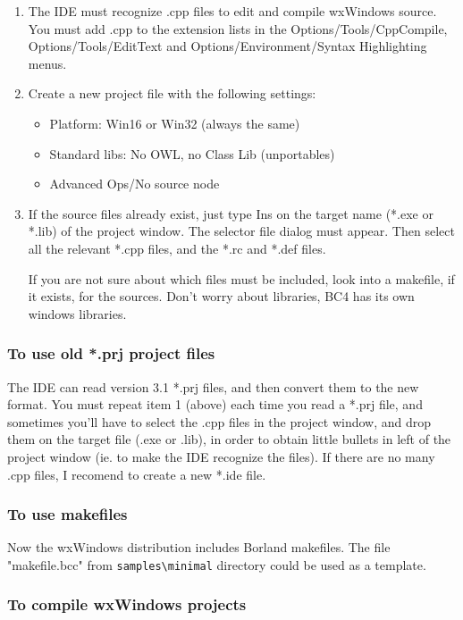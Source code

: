\begin{enumerate}
\item The IDE must recognize .cpp files to edit and compile wxWindows
source. You must add .cpp to the extension lists in the
Options/Tools/CppCompile, Options/Tools/EditText and
Options/Environment/Syntax Highlighting menus.
\item Create a new project file with the following settings:
\begin{itemize}
\item Platform: Win16 or Win32 (always the same)
\item Standard libs: No OWL, no Class Lib (unportables)
\item Advanced Ops/No source node
\end{itemize}
\item If the source files already exist, just type Ins on the target name
(*.exe or *.lib) of the project window. The selector file dialog must
appear. Then select all the relevant *.cpp files, and the *.rc and 
*.def files. 

If you are not sure about which files must be included, look into a
makefile, if it exists, for the sources. Don't worry about libraries,
BC4 has its own windows libraries.
\end{enumerate}

\subsubsection{To use old *.prj project files}

The IDE can read version 3.1 *.prj files, and then convert them to the
new format. You must repeat item 1 (above) each time you read
a *.prj file, and sometimes you'll have to select the .cpp files in 
the project window, and drop them on the target file (.exe or .lib), 
in order to obtain little bullets in left of the project window 
(ie. to make the IDE recognize the files). If there are no many .cpp 
files, I recomend to create a new *.ide file.

\subsubsection{To use makefiles}

Now the wxWindows distribution includes Borland makefiles.
The file "makefile.bcc" from \verb$samples\minimal$ directory could
be used as a template.

\subsubsection{To compile wxWindows projects}

